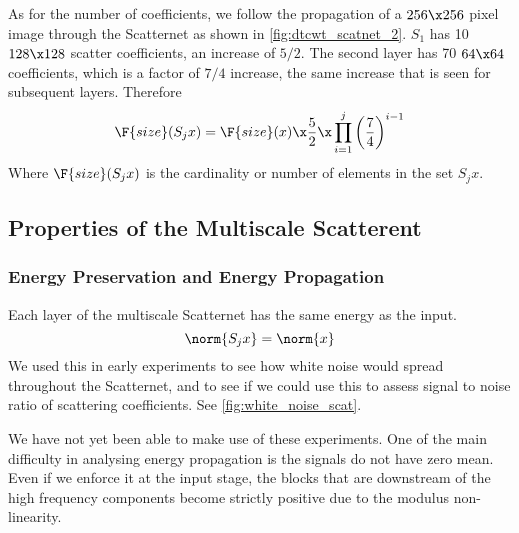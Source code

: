   As for the number of coefficients, we follow the propagation of a $256\x 256$
  pixel image through the Scatternet as shown in \autoref{fig:dtcwt_scatnet_2}.
  $S_1$ has 10 $128\x 128$ scatter coefficients, an increase
  of $5/2$. The second layer has 70 $64\x 64$ coefficients, which is a factor
  of $7/4$ increase, the same increase that is seen for subsequent layers.
  Therefore
  \begin{equation}
    \F{size}(S_{j} x) = \F{size}(x) \x \frac{5}{2} \x \prod_{i=1}^{j} 
      \left(\frac{7}{4}\right)^{i-1}
  \end{equation}
  Where $\F{size}(S_{j}x)$ is the cardinality or number of elements in the set
  $S_{j}x$.

\subsection{Properties of the Multiscale Scatterent}
\subsubsection{Energy Preservation and Energy Propagation}
  Each layer of the multiscale Scatternet has the same energy as the input. 
  \begin{equation}
    \norm{S_{j} x} = \norm{x}
  \end{equation}
  We used this in early experiments to see how white noise would spread throughout
  the Scatternet, and to see if we could use this to assess signal to noise
  ratio of scattering coefficients. See \autoref{fig:white_noise_scat}.
  
  We have not yet been able to make use of these experiments. One of the main
  difficulty in analysing energy propagation is the signals do not have zero
  mean. Even if we enforce it at the input stage, the blocks that are
  downstream of the high frequency components become strictly positive due to
  the modulus non-linearity.


